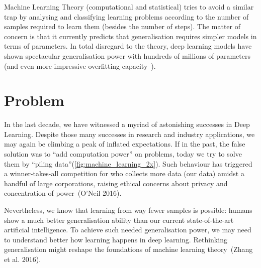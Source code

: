 \documentclass[
  letterpaper,
  a4paper,
  12pt,
  twoside,
  brazil,
  british,
  open=right]{scrbook}
\begin{document}
Machine Learning Theory (computational and statistical) tries to avoid a
similar trap by analysing and classifying learning problems according to
the number of samples required to learn them (besides the number of
steps). The matter of concern is that it currently predicts that
generalisation requires simpler models in terms of parameters. In total
disregard to the theory, deep learning models have shown spectacular
generalisation power with hundreds of millions of parameters (and even
more impressive overfitting capacity~).

\hypertarget{problem}{%
\section{Problem}\label{problem}}

In the last decade, we have witnessed a myriad of astonishing successes
in Deep Learning. Despite those many successes in research and industry
applications, we may again be climbing a peak of inflated expectations.
If in the past, the false solution was to ``add computation power'' on
problems, today we try to solve them by ``piling
data''(\protect\hyperlink{fig:machine_learning_2x}{{[}fig:machine\_learning\_2x{]}}).
Such behaviour has triggered a winner-takes-all competition for who
collects more data (our data) amidst a handful of large corporations,
raising ethical concerns about privacy and concentration of
power~(O'Neil
2016).

Nevertheless, we know that learning from way fewer samples is possible:
humans show a much better generalisation ability than our current
state-of-the-art artificial intelligence. To achieve such needed
generalisation power, we may need to understand better how learning
happens in deep learning. Rethinking generalisation might reshape the
foundations of machine learning theory~(Zhang et al.
2016).
\end{document}
